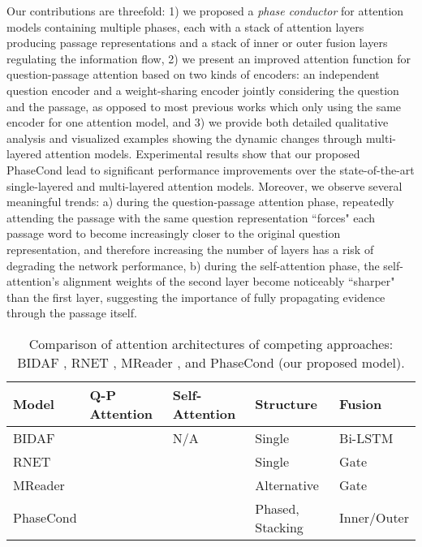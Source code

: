 \documentclass{article} \usepackage{arxiv, times}
\begin{document}
Our contributions are threefold: 1) we proposed a \textit{phase conductor} for attention models containing multiple phases, each with a stack of attention layers producing passage representations and a stack of inner or outer fusion layers regulating the information flow,
2) we present an improved attention function for question-passage attention based on two kinds of encoders: an independent question encoder and a weight-sharing encoder jointly considering the question and the passage, as opposed to most previous works which only using the same encoder for one attention model, 
and 3) we provide both detailed qualitative analysis and visualized examples showing the dynamic changes through multi-layered attention models. Experimental results show that our proposed PhaseCond lead to significant performance improvements over the state-of-the-art single-layered and multi-layered attention models. Moreover, we observe several meaningful trends: a) during the question-passage attention phase, repeatedly attending the passage with the same question representation ``forces" each passage word to become increasingly closer to the original question representation, and therefore increasing the number of layers has a risk of degrading the network performance, b) during the self-attention phase, the self-attention's alignment weights of the second layer become noticeably ``sharper" than the first layer, suggesting the importance of fully propagating evidence through the passage itself.   












\begin{table}[t]
\caption{Comparison of attention architectures of competing approaches: BIDAF \citep{seo2016bidirectional}, RNET \citep{wang2017gated}, MReader \citep{hureinforced}, and PhaseCond (our proposed model).}
\label{tab:attention-summary}
\begin{center}
\begin{tabular}{p{}p{}p{}p{}p{}}\hline
Model  &Q-P Attention  &Self-Attention  & Structure  &  Fusion\\ \hline
BIDAF   &  & N/A & Single & Bi-LSTM\\
RNET  &  &  & Single & Gate\\
MReader   &   &  & Alternative & Gate\\
PhaseCond   &  &  & Phased, Stacking & Inner/Outer\\\hline
\end{tabular}
\end{center}
\end{table}
 
\end{document}
